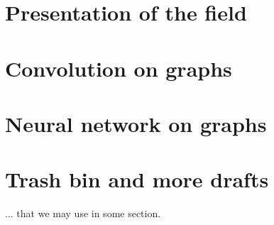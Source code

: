 \documentclass[12pt]{book}
\begin{document}

%
%


%
%

\dominitoc
\tableofcontents

%
%

%

%
%

\chapter{Presentation of the field}

\vfill\minitoc\newpage

\newpage
\newpage
\newpage

%
%

\chapter{Convolution on graphs}
\vfill\minitoc\newpage
\newpage

%
%

\chapter{Neural network on graphs}

%
%

%
%

\setcounter{chapter}{-1}
\chapter{Trash bin and more drafts}
... that we may use in some section.
\vfill\minitoc\newpage

\newpage
\newpage
\newpage

%
%

\chapter*{}
\setcounter{chapter}{0}

\end{document}
